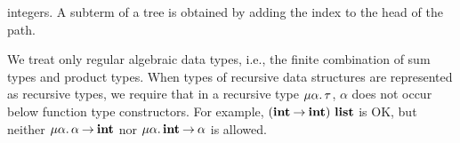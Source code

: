 integers.  A subterm of a tree is obtained by adding the index to the head of the path.

We treat only regular algebraic data types, i.e., the finite combination of sum
types and product types.  When types of recursive data structures are
represented as recursive types, we require that in a recursive type
$\mu{\alpha}.\, {\tau}$, $\alpha$ does not occur below function type
constructors. For example, ${({\mathbf{int}}\mathbin{\rightarrow}{\mathbf{int}})}\ \mathbf{list}$ is OK, but
neither $\mu{\alpha}.\, {{\alpha}\mathbin{\rightarrow}{\mathbf{int}}}$ nor
$\mu{\alpha}.\, {{\mathbf{int}}\mathbin{\rightarrow}{\alpha}}$ is allowed.


